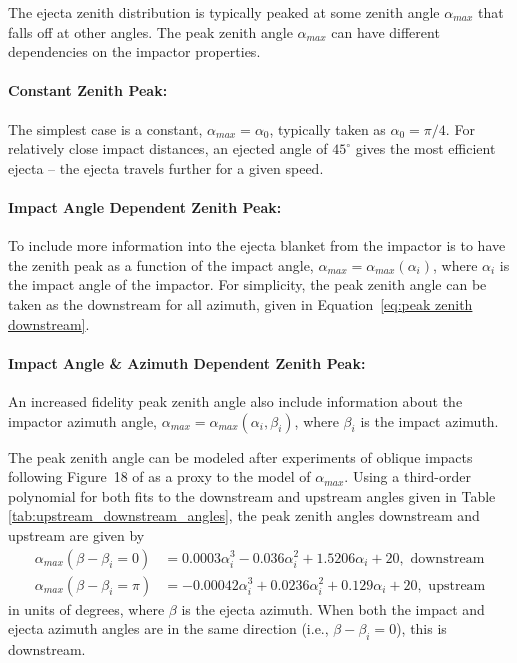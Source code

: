 \documentclass{article}
\begin{document}
The ejecta zenith distribution is typically peaked at some zenith angle $\alpha_{max}$ that falls off at other angles. The peak zenith angle $\alpha_{max}$ can have different dependencies on the impactor properties.


\paragraph{Constant Zenith Peak:}
The simplest case is a constant, $\alpha_{max} = \alpha_0$, typically taken as $\alpha_0 = \pi/4$. For relatively close impact distances, an ejected angle of $45^\circ$ gives the most efficient ejecta -- the ejecta travels further for a given speed.

\paragraph{Impact Angle Dependent Zenith Peak:}
To include more information into the ejecta blanket from the impactor is to have the zenith peak as a function of the impact angle, $\alpha_{max} = \alpha_{max}(\alpha_i)$, where $\alpha_i$ is the impact angle of the impactor. For simplicity, the peak zenith angle can be taken as the downstream for all azimuth, given in Equation~\eqref{eq:peak zenith downstream}.

\paragraph{Impact Angle \& Azimuth Dependent Zenith Peak:}
An increased fidelity peak zenith angle also include information about the impactor azimuth angle, $\alpha_{max} = \alpha_{max}(\alpha_i, \beta_i)$, where $\beta_i$ is the impact azimuth.

The peak zenith angle can be modeled after experiments of oblique impacts following Figure~18 of \cite{gault1978experimental} as a proxy to the model of $\alpha_{max}$. Using a third-order polynomial for both fits to the downstream and upstream angles given in Table \ref{tab:upstream_downstream_angles}, the peak zenith angles downstream and upstream are given by
\begin{align}\label{eq:peak zenith downstream}
\alpha_{max}(\beta - \beta_i = 0) &= 0.0003\alpha_i^3 - 0.036\alpha_i^2 + 1.5206\alpha_i + 20, \text{ downstream}\\
\alpha_{max}(\beta - \beta_i = \pi) &= -0.00042\alpha_i^3 + 0.0236\alpha_i^2 + 0.129\alpha_i + 20, \text{ upstream}
\end{align}
in units of degrees, where $\beta$ is the ejecta azimuth. When both the impact and ejecta azimuth angles are in the same direction (i.e., $\beta-\beta_i = 0$), this is downstream.
\end{document}
